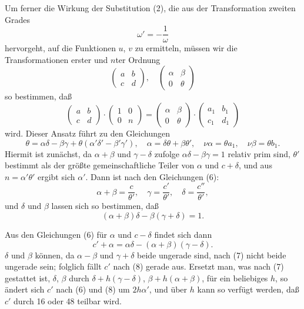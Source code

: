 \documentclass[12pt,a4paper]{article}
\theoremstyle{definition}
\begin{document}
Um ferner die Wirkung der Substitution (2), die aus der Transformation zweiten Grades
\[
\omega' = -\frac{1}{\omega}
\]
hervorgeht, auf die Funktionen $u$, $v$ zu ermitteln, müssen wir die Transformationen erster und $n$ter Ordnung
\[
\begin{pmatrix} a & b \\ c & d \end{pmatrix}, \quad \begin{pmatrix} \alpha & \beta \\ 0 & \theta \end{pmatrix}
\]
so bestimmen, daß
\[
\begin{pmatrix} a & b \\ c & d \end{pmatrix} \cdot \begin{pmatrix} 1 & 0 \\ 0 & n \end{pmatrix} = \begin{pmatrix} \alpha & \beta \\ 0 & \theta \end{pmatrix} \cdot \begin{pmatrix} a_1 & b_1 \\ c_1 & d_1 \end{pmatrix}
\]
wird. Dieser Ansatz führt zu den Gleichungen
\[
\theta = \alpha\delta - \beta\gamma + \theta(\alpha'\delta' - \beta'\gamma'), \quad \alpha = \delta\theta + \beta\theta', \quad \nu\alpha = \theta a_1, \quad \nu\beta = \theta b_1.
\]
Hiermit ist zunächst, da $\alpha + \beta$ und $\gamma - \delta$ zufolge $\alpha\delta - \beta\gamma = 1$ relativ prim sind, $\theta'$ bestimmt als der größte gemeinschaftliche Teiler von $\alpha$ und $c + \delta$, und aus $n = \alpha'\theta'$ ergibt sich $\alpha'$. Dann ist nach den Gleichungen (6):
\[
\alpha + \beta = \frac{c}{\theta'}, \quad \gamma = \frac{c'}{\theta'}, \quad \delta = \frac{c''}{\theta'},
\]
und $\delta$ und $\beta$ lassen sich so bestimmen, daß
\begin{equation}\label{eq:73-7}
(\alpha + \beta)\delta - \beta(\gamma + \delta) = 1.
\end{equation}

Aus den Gleichungen (6) für $\alpha$ und $c - \delta$ findet sich dann
\begin{equation}\label{eq:73-8}
c' + \alpha = \alpha\delta - (\alpha + \beta)(\gamma - \delta).
\end{equation}
$\delta$ und $\beta$ können, da $\alpha - \beta$ und $\gamma + \delta$ beide ungerade sind, nach (7) nicht beide ungerade sein; folglich fällt $c'$ nach (8) gerade aus. Ersetzt man, was nach (7) gestattet ist, $\delta$, $\beta$ durch $\delta + h(\gamma - \delta)$, $\beta + h(\alpha + \beta)$, für ein beliebiges $h$, so ändert sich $c'$ nach (6) und (8) um $2h\alpha'$, und über $h$ kann so verfügt werden, daß $c'$ durch 16 oder 48 teilbar wird.
\end{document}
